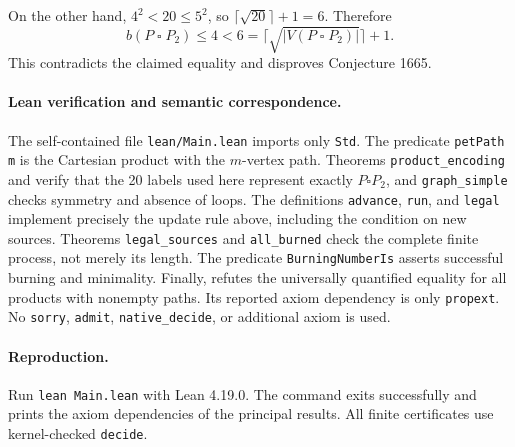 \documentclass[10pt]{article}
\begin{document}
On the other hand, $4^2<20\leq5^2$, so
$\lceil\sqrt{20}\rceil+1=6$. Therefore
\[
 b(P\mathbin\square P_2)\leq4<6
 =\lceil\sqrt{|V(P\mathbin\square P_2)|}\rceil+1.
\]
This contradicts the claimed equality and disproves Conjecture 1665.

\paragraph{Lean verification and semantic correspondence.}
The self-contained file \texttt{lean/Main.lean} imports only \texttt{Std}.
The predicate \texttt{petPath m} is the Cartesian product with the
$m$-vertex path. Theorems \texttt{product\_encoding} and
 verify that the 20 labels used
here represent exactly $P\square P_2$, and \texttt{graph\_simple}
checks symmetry and absence of loops.
The definitions \texttt{advance}, \texttt{run}, and \texttt{legal}
implement precisely the update rule above, including the condition on
new sources. Theorems \texttt{legal\_sources} and \texttt{all\_burned}
check the complete finite process, not merely its length.
The predicate \texttt{BurningNumberIs} asserts successful burning and
minimality. Finally,  refutes the
universally quantified equality for all products with nonempty paths.
Its reported axiom dependency is only \texttt{propext}. No
\texttt{sorry}, \texttt{admit}, \texttt{native\_decide}, or additional
axiom is used.

\paragraph{Reproduction.}
Run \texttt{lean Main.lean} with Lean 4.19.0. The command exits
successfully and prints the axiom dependencies of the principal results.
All finite certificates use kernel-checked \texttt{decide}.
\end{document}
